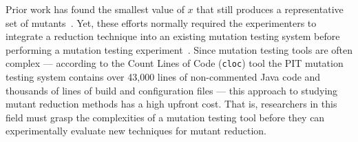 


Prior work has found the smallest value of $x$ that still produces a representative set of
mutants~\cite{jia2011analysis, mathur1994empirical}. Yet, these efforts normally required the experimenters to integrate
a reduction technique into an existing mutation testing system before performing a mutation testing
experiment~\cite{demillo1988extended, king1991fortran}. Since mutation testing tools are often complex --- according to
the Count Lines of Code ({\tt cloc}) tool the PIT mutation testing system contains over 43,000 lines of non-commented
Java code and thousands of lines of build and configuration files --- this approach to studying mutant reduction methods
has a high upfront cost. That is, researchers in this field must grasp the complexities of a mutation testing tool
before they can experimentally evaluate new techniques for mutant reduction.


